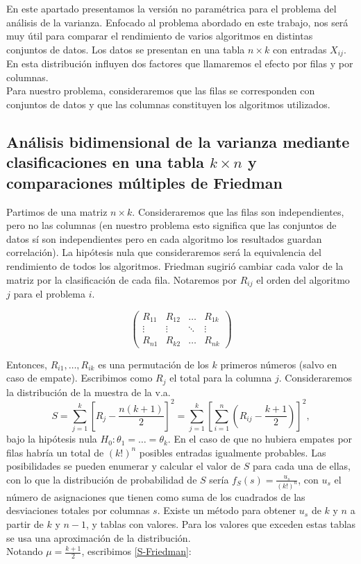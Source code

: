 	En este apartado presentamos la versión no paramétrica 
para el problema del análisis de la varianza. Enfocado al 
problema abordado en este trabajo, nos será muy útil para 
comparar el rendimiento de varios algoritmos en distintas 
conjuntos de datos. Los datos se presentan en una tabla $n \times 
k$ con entradas $X_{ij}$. En esta distribución influyen dos 
factores que llamaremos el efecto por filas y por columnas.\\
	Para nuestro problema, consideraremos que las filas se 
corresponden con conjuntos de datos y que las columnas 
constituyen los algoritmos utilizados. 
	
\subsection{Análisis bidimensional de la varianza mediante clasificaciones en una tabla $k \times n$ y comparaciones múltiples de Friedman}

	Partimos de una matriz $n \times k$. Consideraremos que 
las filas son independientes, pero no las columnas (en 
nuestro problema esto significa que las conjuntos de datos sí 
son independientes pero en cada algoritmo los resultados guardan 
correlación). La hipótesis nula que consideraremos será la 
equivalencia del rendimiento de todos los algoritmos.
Friedman sugirió cambiar cada valor de la 
matriz por la clasificación de cada fila. Notaremos por $R_{ij}$
el orden del algoritmo $j$ para el problema $i$.

	\[ \left( \begin{matrix}
		R_{11} & R_{12} & \dots & R_{1k} \\
		\vdots & \vdots & \ddots & \vdots \\
		R_{n1} & R_{k2} & \dots & R_{nk}
		\end{matrix} \right)	\]

	Entonces, $R_{i1}, \dots, R_{ik}$ es una permutación de 
los $k$ primeros números (salvo en caso de empate). 
Escribimos como $R_j$ el total para la columna $j$. 
Consideraremos la distribución de la muestra de la v.a. 
	\begin{equation}
		 S = \sum\limits_{j=1}^k
				\left[
					R_j - \frac{n(k+1)}{2}
				\right]^2 =
			\sum\limits_{j=1}^k \left[
				\sum\limits_{i=1}^n \left(
					R_{ij} - \frac{k+1}{2}
				\right)
			\right]^2,
	\label{S-Friedman}
	\end{equation}
bajo la hipótesis nula $H_0: \theta_1 = \dots = 
\theta_k$. En el caso de que no hubiera empates por filas 
habría un total de $(k!)^n$ posibles entradas igualmente 
probables. Las posibilidades se pueden enumerar y calcular el 
valor de $S$ para cada una de ellas, con lo que la 
distribución de probabilidad de $S$ sería $f_S(s) = 
\frac{u_s}{(k!)^n}$, con $u_s$ el número de asignaciones que 
tienen como suma de los cuadrados de las desviaciones totales 
por columnas $s$. Existe un método para obtener $u_s$ de $k$ 
y $n$ a partir de $k$ y $n-1$, y tablas con valores. Para los 
valores que exceden estas tablas se usa una aproximación de 
la distribución.\\
	Notando $\mu = \frac{k+1}{2}$, escribimos 
	\ref{S-Friedman}:
	
